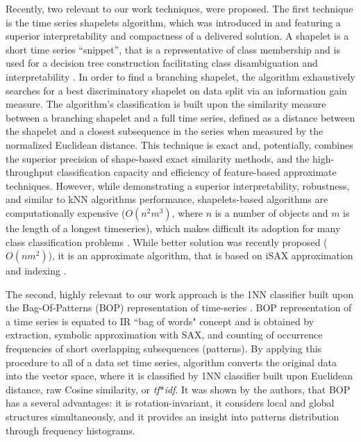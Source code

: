 \documentclass[conference]{IEEEtran}
\begin{document}
Recently, two relevant to our work techniques, were proposed. 
The first technique is the time series shapelets algorithm,
which was introduced in \cite{shapelet} and featuring a superior interpretability 
and compactness of a delivered solution. 
A shapelet is a short time series ``snippet'', that is a representative of class
membership and is used for a decision tree construction facilitating class 
disambiguation and interpretability \cite{logical}.
In order to find a branching shapelet, the algorithm exhaustively searches for a best 
discriminatory shapelet on data split via an information gain measure. 
The algorithm's classification is built upon the similarity measure between a branching shapelet 
and a full time series, defined as a distance between the shapelet and a closest 
subsequence in the series when measured by the normalized Euclidean distance. 
This technique is exact and, potentially, combines the superior precision of 
shape-based exact similarity methods, and the high-throughput 
classification capacity and efficiency of feature-based approximate techniques. 
However, while demonstrating a superior interpretability, robustness, and similar to kNN 
algorithms performance, shapelets-based algorithms are computationally expensive 
($O(n^{2}m^{3})$, where $n$ is a number of objects and $m$ is the length of a 
longest timeseries),
which makes difficult its adoption for many class classification problems \cite{bagnal}. 
While better solution was recently proposed ($O(nm^{2})$), it is an approximate 
algorithm, that is based on iSAX approximation and indexing \cite{fast-shapelets}.

The second, highly relevant to our work approach is the 1NN classifier built upon the 
Bag-Of-Patterns (BOP) representation of time-series \cite{bag_patterns}.
BOP representation of a time series is equated to IR ``bag of words" concept
and is obtained by extraction, symbolic approximation with SAX, 
and counting of occurrence frequencies of short overlapping 
subsequences (patterns). By applying this procedure to all of a data set time series, 
algorithm converts the original data into the vector space, where it is classified
by 1NN classifier built upon Euclidean distance, raw Cosine similarity, or \textit{tf$\ast$idf}. 
It was shown by the authors, that BOP has a several advantages: 
it is rotation-invariant, it considers local and global structures simultaneously, 
and it provides an insight into patterns distribution through frequency histograms.

\end{document}
